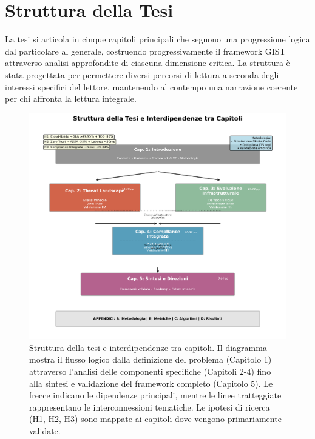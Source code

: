 \section{Struttura della Tesi}

La tesi si articola in cinque capitoli principali che seguono una progressione logica dal particolare al generale, costruendo progressivamente il framework GIST attraverso analisi approfondite di ciascuna dimensione critica. La struttura è stata progettata per permettere diversi percorsi di lettura a seconda degli interessi specifici del lettore, mantenendo al contempo una narrazione coerente per chi affronta la lettura integrale.

\begin{figure}[H]
\centering
\includegraphics[width=1\textwidth]{figure/thesis_figures/cap1/fig_1_4_thesis_structure.pdf}
\caption{Struttura della tesi e interdipendenze tra capitoli. Il diagramma mostra il flusso logico dalla definizione del problema (Capitolo 1) attraverso l'analisi delle componenti specifiche (Capitoli 2-4) fino alla sintesi e validazione del framework completo (Capitolo 5). Le frecce indicano le dipendenze principali, mentre le linee tratteggiate rappresentano le interconnessioni tematiche. Le ipotesi di ricerca (H1, H2, H3) sono mappate ai capitoli dove vengono primariamente validate.}
\label{fig:thesis_structure}
\end{figure}

